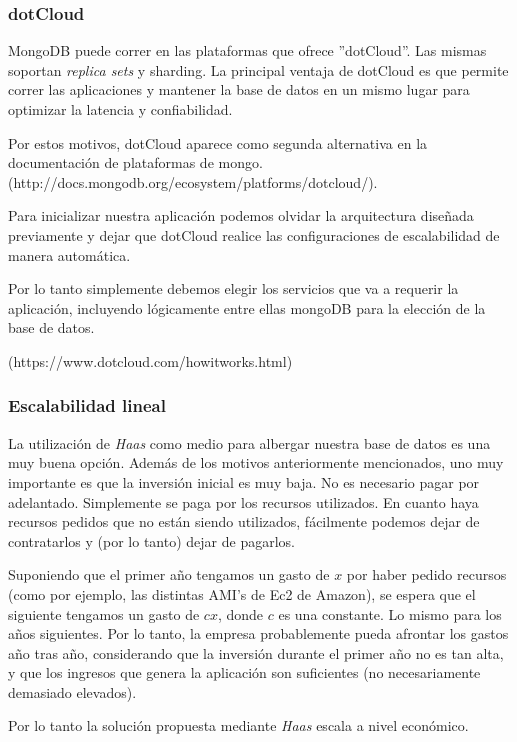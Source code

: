 \subsubsection{dotCloud}

MongoDB puede correr en las plataformas que ofrece ''dotCloud''. Las mismas soportan \emph{replica sets} y sharding.
La principal ventaja de dotCloud es que permite correr las aplicaciones y mantener la base de datos en un mismo lugar
para optimizar la latencia y confiabilidad.

Por estos motivos, dotCloud aparece como segunda alternativa en la documentación de plataformas de mongo.
(http://docs.mongodb.org/ecosystem/platforms/dotcloud/).

Para inicializar nuestra aplicación podemos olvidar la arquitectura diseñada previamente y dejar que dotCloud realice
las configuraciones de escalabilidad de manera automática. 

Por lo tanto simplemente debemos elegir los servicios que va a requerir la aplicación, incluyendo 
lógicamente entre ellas mongoDB para la elección de la base de datos.

(https://www.dotcloud.com/howitworks.html)


\subsubsection{Escalabilidad lineal}

La utilización de \emph{Haas} como medio para albergar nuestra base de datos es una muy buena opción. Además de los motivos
anteriormente mencionados, uno muy importante es que la inversión inicial es muy baja. No es necesario pagar por adelantado.
Simplemente se paga por los recursos  utilizados. En cuanto haya recursos pedidos que no están siendo utilizados, fácilmente
podemos dejar de contratarlos y (por lo tanto) dejar de pagarlos.

Suponiendo que el primer a\~no tengamos un gasto de $x$ por haber pedido recursos (como por ejemplo, las distintas AMI's de
Ec2 de Amazon), se espera que el siguiente tengamos un gasto de $cx$, donde $c$ es una constante. Lo mismo para los a\~nos
siguientes. Por lo tanto, la empresa probablemente pueda afrontar los gastos a\~no tras a\~no, considerando que 
la inversión durante el primer a\~no no es tan alta, y que los ingresos que genera la aplicaci\'on son suficientes (no
necesariamente demasiado elevados).

Por lo tanto la solución propuesta mediante \emph{Haas} escala a nivel económico.

